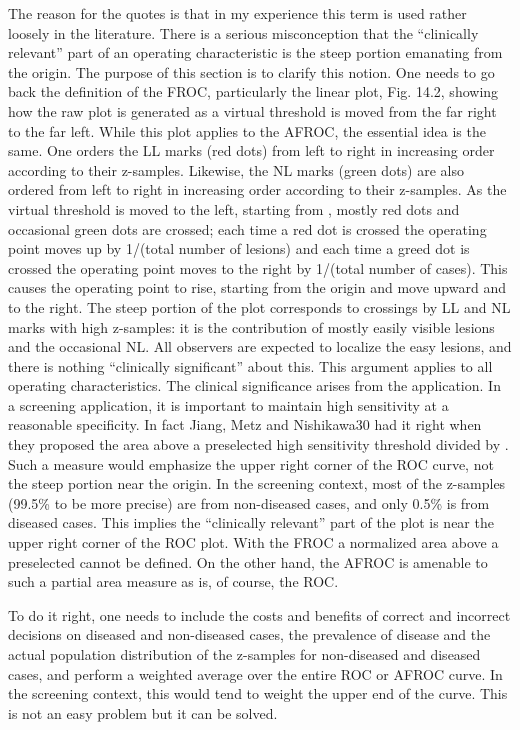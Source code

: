 \documentclass[
]{book}
\begin{document}
The reason for the quotes is that in my experience this term is used rather loosely in the literature. There is a serious misconception that the ``clinically relevant'' part of an operating characteristic is the steep portion emanating from the origin. The purpose of this section is to clarify this notion. One needs to go back the definition of the FROC, particularly the linear plot, Fig. 14.2, showing how the raw plot is generated as a virtual threshold is moved from the far right to the far left. While this plot applies to the AFROC, the essential idea is the same. One orders the LL marks (red dots) from left to right in increasing order according to their z-samples. Likewise, the NL marks (green dots) are also ordered from left to right in increasing order according to their z-samples. As the virtual threshold is moved to the left, starting from , mostly red dots and occasional green dots are crossed; each time a red dot is crossed the operating point moves up by 1/(total number of lesions) and each time a greed dot is crossed the operating point moves to the right by 1/(total number of cases). This causes the operating point to rise, starting from the origin and move upward and to the right. The steep portion of the plot corresponds to crossings by LL and NL marks with high z-samples: it is the contribution of mostly easily visible lesions and the occasional NL. All observers are expected to localize the easy lesions, and there is nothing ``clinically significant'' about this. This argument applies to all operating characteristics. The clinical significance arises from the application. In a screening application, it is important to maintain high sensitivity at a reasonable specificity. In fact Jiang, Metz and Nishikawa30 had it right when they proposed the area above a preselected high sensitivity threshold divided by . Such a measure would emphasize the upper right corner of the ROC curve, not the steep portion near the origin. In the screening context, most of the z-samples (99.5\% to be more precise) are from non-diseased cases, and only 0.5\% is from diseased cases. This implies the ``clinically relevant'' part of the plot is near the upper right corner of the ROC plot. With the FROC a normalized area above a preselected cannot be defined. On the other hand, the AFROC is amenable to such a partial area measure as is, of course, the ROC.

To do it right, one needs to include the costs and benefits of correct and incorrect decisions on diseased and non-diseased cases, the prevalence of disease and the actual population distribution of the z-samples for non-diseased and diseased cases, and perform a weighted average over the entire ROC or AFROC curve. In the screening context, this would tend to weight the upper end of the curve. This is not an easy problem but it can be solved.
\end{document}
